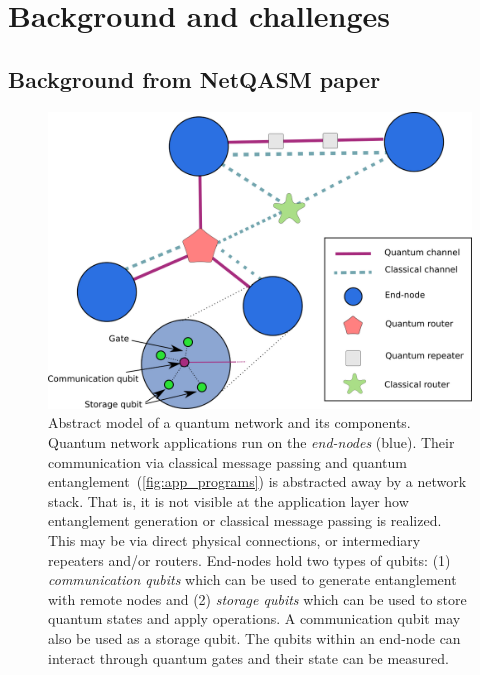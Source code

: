 \chapter
 [Background and challenges]
 {Background and challenges}
\label{chp:background}




\section{Background from NetQASM paper}
\begin{figure}[t]
    \centering
    \includegraphics[width=0.4\linewidth]{figures/netqasm/network_model.png}
    \caption{
      Abstract model of a quantum network and its components.
      Quantum network applications run on the \emph{end-nodes} (blue).
      Their communication via classical message passing and quantum entanglement~(\cref{fig:app_programs}) is abstracted away by a network stack.
      That is, it is not visible at the application layer how entanglement generation or classical message passing is realized.
      This may be via direct physical connections, or intermediary repeaters and/or routers.
      End-nodes hold two types of qubits:
        (1) \emph{communication qubits} which can be used to generate entanglement with remote nodes and
        (2) \emph{storage qubits} which can be used to store quantum states and apply operations.
      A communication qubit may also be used as a storage qubit.
      The qubits within an end-node can interact through quantum gates and their state can be measured.
    }
    \label{fig:network_model}
\end{figure}

